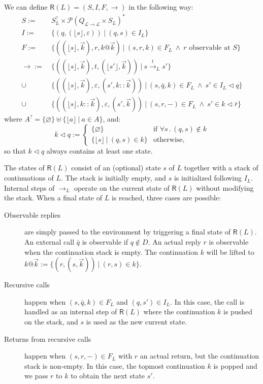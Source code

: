 \documentclass[11pt]{article}
\newcommand{\kw}[1]{{\mathsf{#1}}}
\begin{document}
We can define $\kw{R}(L) = (S, I, F, {\rightarrow})$ in the following way:
\begin{align*}
  S := &\: S_L^? \times \mathcal{P}(Q_{\mathcal{L} \multimap \mathcal{L}} \times S_L)^* \\
  I := &\: \{ (q, (\lfloor s \rfloor, \varepsilon)) \: \vert \: (q, s) \in I_L \} \\
  F := &\: \{ ((\lfloor s \rfloor, \vec{k}), r, k@\vec{k}) \: \vert \:
           (s, r, k) \in F_L \: \wedge \: r \mbox{ observable at } S \} \\
  {\rightarrow} :=
    &\: \{ ((\lfloor s \rfloor, \vec{k}), t, (\lfloor s' \rfloor, \vec{k})) \: \vert \:
        s \stackrel{t}{\longrightarrow}_L s' \} \\
    \cup &\: \{ ((\lfloor s \rfloor, \vec{k}), \varepsilon, (s', k::\vec{k})) \: \vert \:
        (s, \bar{q}, k) \in F_L \: \wedge \:
        s' \in I_L \lhd q \} \\
    \cup &\: \{ ((\lfloor s \rfloor, k::\vec{k}), \varepsilon, (s', \vec{k})) \: \vert \:
        (s, r, -) \in F_L \: \wedge \:
        s' \in k \lhd \bar{r} \}
\end{align*}
where $A^? = \{ \varnothing \} \uplus \{ \lfloor a \rfloor \:|\: a \in A \}$, and:
\[
  k \lhd q :=
  \begin{cases}
    \{ \varnothing \} &\mbox{if } \forall s \,.\, (q, s) \notin k \\
    \{ \lfloor s \rfloor \: | \: (q, s) \in k \} &\mbox{otherwise,}
  \end{cases}
\]
so that $k \lhd q$ always contains at least one state.

The states of $\kw{R}(L)$
consist of an (optional) state $s$ of $L$ together with a stack of continuations of $L$.
The stack is initially empty,
and $s$ is initialized following $I_L$.
Internal steps of $\rightarrow_L$ operate on the current state of $\kw{R}(L)$
without modifying the stack.
When a final state of $L$ is reached, three cases are possible:
\begin{description}
\item[Observable replies] are simply passed to the environment
  by triggering a final state of $\kw{R}(L)$.
  An external call $\bar{q}$ is observable if $q \notin D$.
  An actual reply $r$ is observable when the continuation stack is empty.
  The continuation $k$ will be lifted to
  $k@\vec{k} := \{ (r, (s, \vec{k})) \: \vert \: (r, s) \in k \}$.
\item[Recursive calls] happen when
  $(s, \bar{q}, k) \in F_L$ and $(q, s') \in I_L$.
  In this case, the call is handled as an internal step of $\kw{R}(L)$
  where the continuation $k$ is pushed on the stack,
  and $s$ is used as the new current state.
\item[Returns from recursive calls] happen when $(s, r, -) \in F_L$
  with $r$ an actual return, but the continuation stack is non-empty.
  In this case, the topmost continuation $k$ is popped
  and we pass $r$ to $k$ to obtain the next state $s'$.
\end{description}
\end{document}
